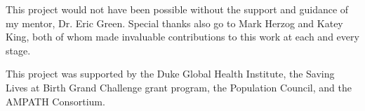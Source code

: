 \acknowledgements

This project would not have been possible without the support and guidance of my mentor, Dr. Eric Green. Special thanks also go to Mark Herzog and Katey King, both of whom made invaluable contributions to this work at each and every stage. 

This project was supported by the Duke Global Health Institute, the Saving Lives at Birth Grand Challenge grant program, the Population Council, and the AMPATH Consortium. 